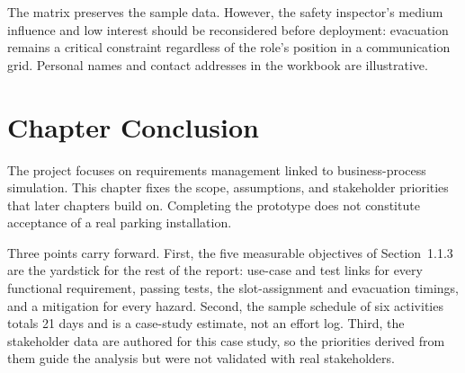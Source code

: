 The matrix preserves the sample data. However, the safety inspector's medium influence and low interest should be reconsidered before deployment: evacuation remains a critical constraint regardless of the role's position in a communication grid. Personal names and contact addresses in the workbook are illustrative.

\section{Chapter Conclusion}
The project focuses on requirements management linked to business-process simulation. This chapter fixes the scope, assumptions, and stakeholder priorities that later chapters build on. Completing the prototype does not constitute acceptance of a real parking installation.

Three points carry forward. First, the five measurable objectives of Section~1.1.3 are the yardstick for the rest of the report: use-case and test links for every functional requirement, passing tests, the slot-assignment and evacuation timings, and a mitigation for every hazard. Second, the sample schedule of six activities totals 21 days and is a case-study estimate, not an effort log. Third, the stakeholder data are authored for this case study, so the priorities derived from them guide the analysis but were not validated with real stakeholders.
